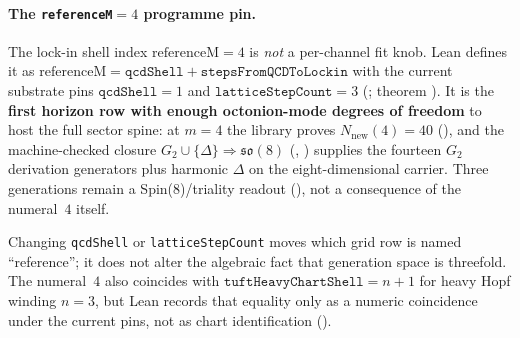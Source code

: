 
\paragraph{The \texttt{referenceM}$=4$ programme pin.}
The lock-in shell index $\mathrm{referenceM}=4$ is \emph{not} a per-channel fit knob.
Lean defines it as $\mathrm{referenceM}=\texttt{qcdShell}+\texttt{stepsFromQCDToLockin}$
with the current substrate pins $\texttt{qcdShell}=1$ and $\texttt{latticeStepCount}=3$
(;
theorem ).
It is the \textbf{first horizon row with enough octonion-mode degrees of freedom}
to host the full sector spine: at $m=4$ the library proves
$N_{\mathrm{new}}(4)=40$ (), and the
machine-checked closure $G_2\cup\{\Delta\}\Rightarrow\mathfrak{so}(8)$
(,
) supplies the fourteen $G_2$ derivation
generators plus harmonic $\Delta$ on the eight-dimensional carrier.
Three generations remain a Spin(8)/triality readout (),
not a consequence of the numeral~$4$ itself.

Changing \texttt{qcdShell} or \texttt{latticeStepCount} moves which grid row is
named ``reference''; it does not alter the algebraic fact that generation space
is threefold.
The numeral~$4$ also coincides with $\texttt{tuftHeavyChartShell}=n+1$ for heavy
Hopf winding $n=3$, but Lean records that equality only as a numeric coincidence
under the current pins, not as chart identification
().

